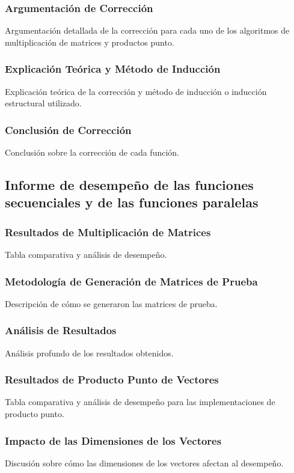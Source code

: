 \documentclass[12pt, a4paper]{article}
\begin{document}
\subsubsection{Argumentación de Corrección}
Argumentación detallada de la corrección para cada uno de los algoritmos de multiplicación de matrices y productos punto.
\subsubsection{Explicación Teórica y Método de Inducción}
Explicación teórica de la corrección y método de inducción o inducción estructural utilizado.
\subsubsection{Conclusión de Corrección}
Conclusión sobre la corrección de cada función.

\subsection{Informe de desempeño de las funciones secuenciales y de las funciones paralelas}
\subsubsection{Resultados de Multiplicación de Matrices}
Tabla comparativa y análisis de desempeño.
\subsubsection{Metodología de Generación de Matrices de Prueba}
Descripción de cómo se generaron las matrices de prueba.
\subsubsection{Análisis de Resultados}
Análisis profundo de los resultados obtenidos.

\subsubsection{Resultados de Producto Punto de Vectores}
Tabla comparativa y análisis de desempeño para las implementaciones de producto punto.
\subsubsection{Impacto de las Dimensiones de los Vectores}
Discusión sobre cómo las dimensiones de los vectores afectan al desempeño.
\end{document}
